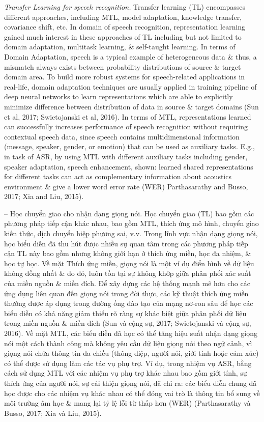 \documentclass{article}
\begin{document}
\begin{itemize}
\begin{itemize}
\begin{itemize}
            {\it Transfer Learning for speech recognition.} Transfer learning (TL) encompasses different approaches, including MTL, model adaptation, knowledge transfer, covariance shift, etc. In domain of speech recognition, representation learning gained much interest in these approaches of TL including but not limited to domain adaptation, multitask learning, \& self-taught learning. In terms of Domain Adaptation, speech is a typical example of heterogeneous data \& thus, a mismatch always exists between probability distributions of source \& target domain area. To build more robust systems for speech-related applications in real-life, domain adaptation techniques are usually applied in training pipeline of deep neural networks to learn representations which are able to explicitly minimize difference between distribution of data in source \& target domains (Sun et al, 2017; Swietojanski et al, 2016). In terms of MTL, representations learned can successfully increases performance of speech recognition without requiring contextual speech data, since speech contains multidimensional information (message, speaker, gender, or emotion) that can be used as auxiliary tasks. E.g., in task of ASR, by using MTL with different auxiliary tasks including gender, speaker adaptation, speech enhancement, shown: learned shared representations for different tasks can act as complementary information about acoustics environment \& give a lower word error rate (WER) Parthasarathy and Busso, 2017; Xia and Liu, 2015).

            -- Học chuyển giao cho nhận dạng giọng nói. Học chuyển giao (TL) bao gồm các phương pháp tiếp cận khác nhau, bao gồm MTL, thích ứng mô hình, chuyển giao kiến thức, dịch chuyển hiệp phương sai, v.v. Trong lĩnh vực nhận dạng giọng nói, học biểu diễn đã thu hút được nhiều sự quan tâm trong các phương pháp tiếp cận TL này bao gồm nhưng không giới hạn ở thích ứng miền, học đa nhiệm, \& học tự học. Về mặt Thích ứng miền, giọng nói là một ví dụ điển hình về dữ liệu không đồng nhất \& do đó, luôn tồn tại sự không khớp giữa phân phối xác suất của miền nguồn \& miền đích. Để xây dựng các hệ thống mạnh mẽ hơn cho các ứng dụng liên quan đến giọng nói trong đời thực, các kỹ thuật thích ứng miền thường được áp dụng trong đường ống đào tạo của mạng nơ-ron sâu để học các biểu diễn có khả năng giảm thiểu rõ ràng sự khác biệt giữa phân phối dữ liệu trong miền nguồn \& miền đích (Sun và cộng sự, 2017; Swietojanski và cộng sự, 2016). Về mặt MTL, các biểu diễn đã học có thể tăng hiệu suất nhận dạng giọng nói một cách thành công mà không yêu cầu dữ liệu giọng nói theo ngữ cảnh, vì giọng nói chứa thông tin đa chiều (thông điệp, người nói, giới tính hoặc cảm xúc) có thể được sử dụng làm các tác vụ phụ trợ. Ví dụ, trong nhiệm vụ ASR, bằng cách sử dụng MTL với các nhiệm vụ phụ trợ khác nhau bao gồm giới tính, sự thích ứng của người nói, sự cải thiện giọng nói, đã chỉ ra: các biểu diễn chung đã học được cho các nhiệm vụ khác nhau có thể đóng vai trò là thông tin bổ sung về môi trường âm học \& mang lại tỷ lệ lỗi từ thấp hơn (WER) (Parthasarathy và Busso, 2017; Xia và Liu, 2015).


\end{itemize}
\end{itemize}
\end{itemize}
\end{document}
